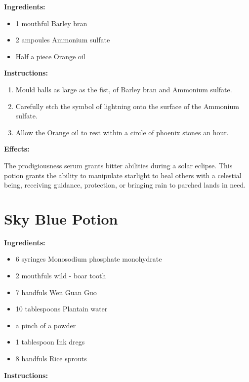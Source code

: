 \documentclass{article}
\begin{document}
\textbf{Ingredients:}

\begin{itemize}
  \item 1 mouthful Barley bran
  \item 2 ampoules Ammonium sulfate
  \item Half a piece Orange oil
\end{itemize}

\textbf{Instructions:}

\begin{enumerate}
  \item Mould balls as large as the fist, of Barley bran and Ammonium sulfate.
  \item Carefully etch the symbol of lightning onto the surface of the Ammonium sulfate.
  \item Allow the Orange oil to rest within a circle of phoenix stones an hour.
\end{enumerate}

\textbf{Effects:}

The prodigiousness serum grants bitter abilities during a solar eclipse. This potion grants the ability to manipulate starlight to heal others with a celestial being, receiving guidance, protection, or bringing rain to parched lands in need.

\newpage
\section*{Sky Blue Potion}

\textbf{Ingredients:}

\begin{itemize}
  \item 6 syringes Monosodium phosphate monohydrate
  \item 2 mouthfuls wild - boar tooth
  \item 7 handfuls Wen Guan Guo
  \item 10 tablespoons Plantain water
  \item a pinch of a powder
  \item 1 tablespoon Ink dregs
  \item 8 handfuls Rice sprouts
\end{itemize}

\textbf{Instructions:}
\end{document}
